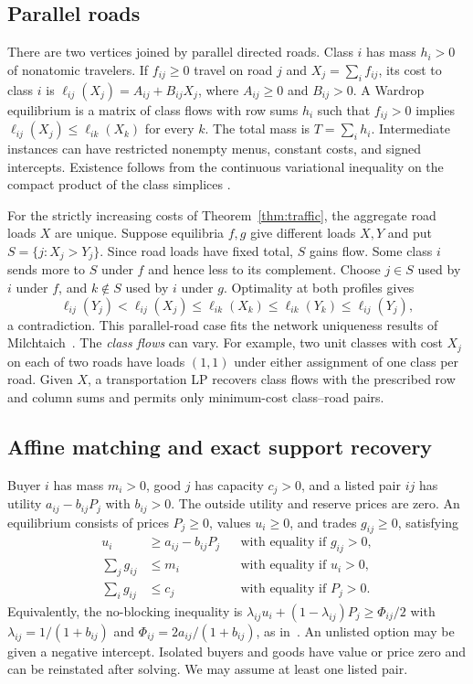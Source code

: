 \documentclass[11pt]{article}
\begin{document}
\subsection{Parallel roads}
There are two vertices joined by parallel directed roads. Class \(i\) has
mass \(h_i>0\) of nonatomic travelers. If \(f_{ij}\ge0\) travel on road \(j\)
and \(X_j=\sum_i f_{ij}\), its cost to class \(i\) is
\(\ell_{ij}(X_j)=A_{ij}+B_{ij}X_j\), where \(A_{ij}\ge0\) and \(B_{ij}>0\).
A Wardrop equilibrium is a matrix of class flows with row sums \(h_i\)
such that \(f_{ij}>0\) implies
\(\ell_{ij}(X_j)\le\ell_{ik}(X_k)\) for every \(k\). The total mass is
\(T=\sum_i h_i\). Intermediate instances can have restricted nonempty menus,
constant costs, and signed intercepts. Existence follows from the continuous
variational inequality on the compact product of the class simplices
\cite{mp}.

For the strictly increasing costs of Theorem~\ref{thm:traffic}, the
aggregate road loads \(X\) are unique. Suppose equilibria \(f,g\) give
different loads \(X,Y\) and put \(S=\{j:X_j>Y_j\}\). Since road loads
have fixed total, \(S\) gains flow. Some class \(i\) sends more to \(S\)
under \(f\) and hence less to its complement. Choose \(j\in S\) used
by \(i\) under \(f\), and \(k\notin S\) used by \(i\) under \(g\).
Optimality at both profiles gives
\[
 \ell_{ij}(Y_j)<\ell_{ij}(X_j)\le\ell_{ik}(X_k)
       \le\ell_{ik}(Y_k)\le\ell_{ij}(Y_j),
\]
a contradiction. This parallel-road case fits the network uniqueness
results of Milchtaich~\cite{milchtaich}. The \emph{class flows} can vary.
For example, two unit classes with cost \(X_j\) on each of two roads
have loads \((1,1)\) under either assignment of one class per road.
Given \(X\), a transportation LP recovers class flows with the prescribed
row and column sums and permits only minimum-cost class--road pairs.

\subsection{Affine matching and exact support recovery}
Buyer \(i\) has mass \(m_i>0\), good \(j\) has capacity \(c_j>0\), and
a listed pair \(ij\) has utility \(a_{ij}-b_{ij}P_j\) with \(b_{ij}>0\).
The outside utility and reserve prices are zero. An equilibrium consists of
prices \(P_j\ge0\), values \(u_i\ge0\), and trades \(g_{ij}\ge0\), satisfying
\begin{align}
 u_i&\ge a_{ij}-b_{ij}P_j
       &&\text{with equality if }g_{ij}>0,\nonumber\\
 \sum_jg_{ij}&\le m_i &&\text{with equality if }u_i>0,\label{eq:m1}\\
 \sum_i g_{ij}&\le c_j &&\text{with equality if }P_j>0.\nonumber
\end{align}
Equivalently, the no-blocking inequality is
\(\lambda_{ij}u_i+(1-\lambda_{ij})P_j\ge\Phi_{ij}/2\) with
\(\lambda_{ij}=1/(1+b_{ij})\) and \(\Phi_{ij}=2a_{ij}/(1+b_{ij})\),
as in~\cite{gj,book}. An unlisted option may be given a negative intercept.
Isolated buyers and goods have value or price zero and can be reinstated
after solving. We may assume at least one listed pair.
\end{document}
